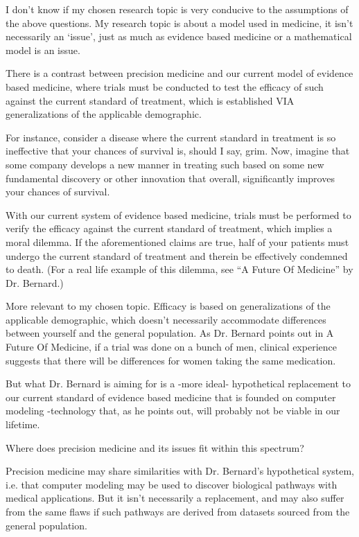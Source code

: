 I don’t know if my chosen research topic is very conducive to the assumptions of the above questions. My research topic is about a model used in medicine, it isn’t necessarily an ‘issue’, just as much as evidence based medicine or a mathematical model is an issue.

There is a contrast between precision medicine and our current model of evidence based medicine, where trials must be conducted to test the efficacy of such against the current standard of treatment, which is established VIA generalizations of the applicable demographic.

For instance, consider a disease where the current standard in treatment is so ineffective that your chances of survival is, should I say, grim. Now, imagine that some company develops a new manner in treating such based on some new fundamental discovery or other innovation that overall, significantly improves your chances of survival. 

With our current system of evidence based medicine, trials must be performed to verify the efficacy against the current standard of treatment, which implies a moral dilemma. If the aforementioned claims are true, half of your patients must undergo the current standard of treatment and therein be effectively condemned to death. (For a real life example of this dilemma, see “A Future Of Medicine” by Dr. Bernard.)

More relevant to my chosen topic. Efficacy is based on generalizations of the applicable demographic, which doesn’t necessarily accommodate differences between yourself and the general population. As Dr. Bernard points out in A Future Of Medicine, if a trial was done on a bunch of men, clinical experience suggests that there will be differences for women taking the same medication.

But what Dr. Bernard is aiming for is a -more ideal- hypothetical replacement to our current standard of evidence based medicine that is founded on computer modeling -technology that, as he points out, will probably not be viable in our lifetime.

Where does precision medicine and its issues fit within this spectrum?

Precision medicine may share similarities with Dr. Bernard’s hypothetical system, i.e. that computer modeling may be used to discover biological pathways with medical applications. But it isn’t necessarily a replacement, and may also suffer from the same flaws if such pathways are derived from datasets sourced from the general population. 


